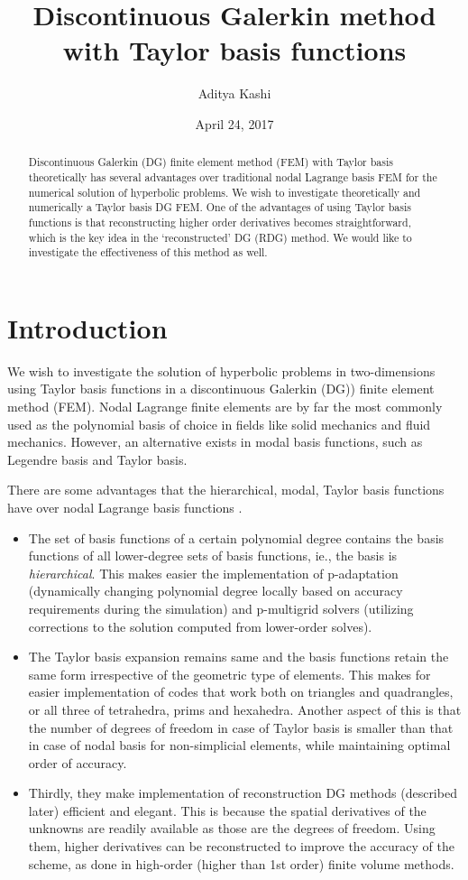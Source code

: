 \documentclass[11pt]{article}
\title{Discontinuous Galerkin method with Taylor basis functions}
\author{Aditya Kashi}
\date{April 24, 2017}
\begin{document}
\maketitle
\begin{abstract}
Discontinuous Galerkin (DG) finite element method (FEM) with Taylor basis theoretically has several advantages over traditional nodal Lagrange basis FEM for the numerical solution of hyperbolic problems. We wish to investigate theoretically and numerically a Taylor basis DG FEM. One of the advantages of using Taylor basis functions is that reconstructing higher order derivatives becomes straightforward, which is the key idea in the `reconstructed' DG (RDG) method. We would like to investigate the effectiveness of this method as well.
\end{abstract}

\section{Introduction}
We wish to investigate the solution of hyperbolic problems in two-dimensions using Taylor basis functions in a discontinuous Galerkin (DG)) finite element method (FEM). Nodal Lagrange finite elements are by far the most commonly used as the polynomial basis of choice in fields like solid mechanics and fluid mechanics. However, an alternative exists in modal basis functions, such as Legendre basis and Taylor basis.

There are some advantages that the hierarchical, modal, Taylor basis functions have over nodal Lagrange basis functions \cite{luo_taylor, aizinger_scaleseparation}. 
\begin{itemize}
\item The set of basis functions of a certain polynomial degree contains the basis functions of all lower-degree sets of basis functions, ie., the basis is \emph{hierarchical}. This makes easier the implementation of p-adaptation (dynamically changing polynomial degree locally based on accuracy requirements during the simulation) and p-multigrid solvers (utilizing corrections to the solution computed from lower-order solves).
\item The Taylor basis expansion remains same and the basis functions retain the same form irrespective of the geometric type of elements. This makes for easier implementation of codes that work both on triangles and quadrangles, or all three of tetrahedra, prims and hexahedra. Another aspect of this is that the number of degrees of freedom in case of Taylor basis is smaller than that in case of nodal basis for non-simplicial elements, while maintaining optimal order of accuracy.
\item Thirdly, they make implementation of reconstruction DG methods (described later) efficient and elegant. This is because the spatial derivatives of the unknowns are readily available as those are the degrees of freedom. Using them, higher derivatives can be reconstructed to improve the accuracy of the scheme, as done in high-order (higher than 1st order) finite volume methods.
\end{itemize}
\end{document}
